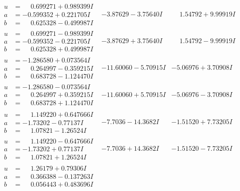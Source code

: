 \documentclass[1p]{elsarticle_modified}
\theoremstyle{definition}
\begin{document}
$$\begin{array}{c|c|c}
\begin{aligned}
u &= \phantom{-}0.699271 + 0.989399 I \\
a &= -0.599352 + 0.221705 I \\
b &= \phantom{-}0.625328 - 0.499987 I\end{aligned}
 & -3.87629 - 3.75640 I & \phantom{-}1.54792 + 9.99919 I \\ \hline\begin{aligned}
u &= \phantom{-}0.699271 - 0.989399 I \\
a &= -0.599352 - 0.221705 I \\
b &= \phantom{-}0.625328 + 0.499987 I\end{aligned}
 & -3.87629 + 3.75640 I & \phantom{-}1.54792 - 9.99919 I \\ \hline\begin{aligned}
u &= -1.286580 + 0.073564 I \\
a &= \phantom{-}0.264997 - 0.359215 I \\
b &= \phantom{-}0.683728 - 1.124470 I\end{aligned}
 & -11.60060 - 5.70915 I & -5.06976 + 3.70908 I \\ \hline\begin{aligned}
u &= -1.286580 - 0.073564 I \\
a &= \phantom{-}0.264997 + 0.359215 I \\
b &= \phantom{-}0.683728 + 1.124470 I\end{aligned}
 & -11.60060 + 5.70915 I & -5.06976 - 3.70908 I \\ \hline\begin{aligned}
u &= \phantom{-}1.149220 + 0.647666 I \\
a &= -1.73202 - 0.77137 I \\
b &= \phantom{-}1.07821 - 1.26524 I\end{aligned}
 & -7.7036 - 14.3682 I & -1.51520 + 7.73205 I \\ \hline\begin{aligned}
u &= \phantom{-}1.149220 - 0.647666 I \\
a &= -1.73202 + 0.77137 I \\
b &= \phantom{-}1.07821 + 1.26524 I\end{aligned}
 & -7.7036 + 14.3682 I & -1.51520 - 7.73205 I \\ \hline\begin{aligned}
u &= \phantom{-}1.26179 + 0.79306 I \\
a &= \phantom{-}0.366388 - 0.137263 I \\
b &= \phantom{-}0.056443 + 0.483696 I\end{aligned}

\end{array}$$
\end{document}
